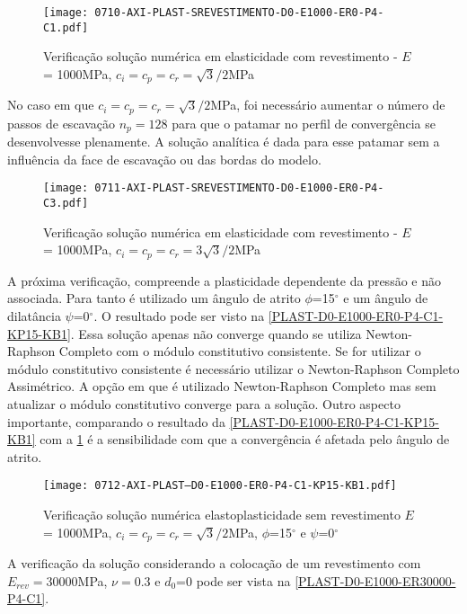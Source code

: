 \begin{figure}[H]
	\begin{center}
		\texttt{[image: 0710-AXI-PLAST-SREVESTIMENTO-D0-E1000-ER0-P4-C1.pdf]}
	\end{center}
	\caption{\label{PLAST-D0-E1000-ER0-P4-C1}Verificação solução numérica em elasticidade com revestimento - $E$ = 1000MPa,  $c_i=c_p=c_r = \sqrt{3}/2$MPa}
\end{figure}
No caso em que $c_i=c_p=c_r = \sqrt{3}/2$MPa, foi necessário aumentar o número de passos de escavação $n_p = 128$ para que o patamar no perfil de convergência se desenvolvesse plenamente. A solução analítica é dada para esse patamar sem a influência da face de escavação ou das bordas do modelo.
\begin{figure}[H]
	\begin{center}
		\texttt{[image: 0711-AXI-PLAST-SREVESTIMENTO-D0-E1000-ER0-P4-C3.pdf]}
	\end{center}
	\caption{\label{PLAST-D0-E1000-ER0-P4-C3}Verificação solução numérica em elasticidade com revestimento - $E$ = 1000MPa, $c_i=c_p=c_r = 3\sqrt{3}/2$MPa}
\end{figure}
 A próxima verificação, compreende a plasticidade dependente da pressão e não associada. Para tanto é utilizado um ângulo de atrito $\phi$=15$^\circ$ e um ângulo de dilatância $\psi$=0$^\circ$. O resultado pode ser visto na \autoref{PLAST-D0-E1000-ER0-P4-C1-KP15-KB1}. Essa solução apenas não converge quando se utiliza Newton-Raphson Completo com o módulo constitutivo consistente. Se for utilizar o módulo constitutivo consistente é necessário utilizar o Newton-Raphson Completo Assimétrico. A opção em que é utilizado Newton-Raphson Completo mas sem atualizar o módulo constitutivo converge para a solução. Outro aspecto importante, comparando o resultado da \autoref{PLAST-D0-E1000-ER0-P4-C1-KP15-KB1} com a \ref{PLAST-D0-E1000-ER0-P4-C1} é a sensibilidade com que a convergência é afetada pelo ângulo de atrito.
\begin{figure}[H]
	\begin{center}
		\texttt{[image: 0712-AXI-PLAST--D0-E1000-ER0-P4-C1-KP15-KB1.pdf]}
	\end{center}
	\caption{\label{PLAST-D0-E1000-ER0-P4-C1-KP15-KB1}Verificação solução numérica elastoplasticidade sem revestimento $E$ = 1000MPa, $c_i=c_p=c_r = \sqrt{3}/2$MPa, $\phi$=15$^\circ$ e $\psi$=0$^\circ$}
\end{figure}

A verificação da solução considerando a colocação de um revestimento com $E_{rev} = 30000$MPa, $\nu = 0.3$ e $d_0$=0 pode ser vista na \ref{PLAST-D0-E1000-ER30000-P4-C1}.

